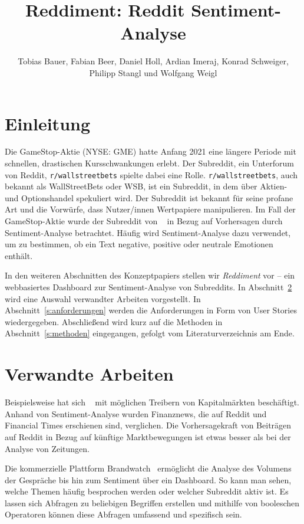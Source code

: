 \documentclass[a4paper, 10pt, conference]{ieeeconf}
\title{\LARGE \bf
Reddiment: Reddit Sentiment-Analyse
}
\author{Tobias Bauer, Fabian Beer,  Daniel Holl,  Ardian Imeraj,  Konrad Schweiger,  Philipp Stangl und Wolfgang Weigl
}
\begin{document}
\maketitle
\thispagestyle{empty}
\pagestyle{empty}

\section{Einleitung}

Die GameStop-Aktie (NYSE: GME) hatte Anfang 2021 eine längere Periode mit schnellen, drastischen Kursschwankungen erlebt. Der Subreddit,  ein Unterforum von Reddit,  \texttt{r/wallstreetbets} spielte dabei eine Rolle. \texttt{r/wallstreetbets}, auch bekannt als WallStreetBets oder WSB, ist ein Subreddit, in dem über Aktien- und Optionshandel spekuliert wird.  Der Subreddit ist bekannt für seine profane Art und die Vorwürfe, dass Nutzer/innen Wertpapiere manipulieren. Im Fall der GameStop-Aktie wurde der Subreddit von \citeauthor{wang2021}~\cite{wang2021} in Bezug auf Vorhersagen durch Sentiment-Analyse betrachtet. Häufig wird Sentiment-Analyse dazu verwendet, um zu bestimmen, ob ein Text negative, positive oder neutrale Emotionen enthält.

In den weiteren Abschnitten des Konzeptpapiers stellen wir \textit{Reddiment} vor -- ein webbasiertes Dashboard zur Sentiment-Analyse von Subreddits. In Abschnitt~\ref{s:verwandte_arbeiten} wird eine Auswahl verwandter Arbeiten vorgestellt.  In Abschnitt~\ref{s:anforderungen} werden die Anforderungen in Form von User Stories wiedergegeben.  Abschließend wird kurz auf die Methoden in Abschnitt~\ref{s:methoden} eingegangen, gefolgt vom Literaturverzeichnis am Ende.


\section{Verwandte Arbeiten} \label{s:verwandte_arbeiten}

Beispielsweise hat sich \citeauthor{lubitz2017}~\cite{lubitz2017} mit möglichen Treibern von Kapitalmärkten beschäftigt. Anhand von Sentiment-Analyse wurden Finanznews, die auf Reddit und Financial Times erschienen sind, verglichen. Die Vorhersagekraft von Beiträgen auf Reddit in Bezug auf künftige Marktbewegungen ist etwas besser als bei der Analyse von Zeitungen.

Die kommerzielle Plattform Brandwatch~\cite{brandwatch} ermöglicht die Analyse des Volumens der Gespräche bis hin zum Sentiment über ein Dashboard. So kann man sehen, welche Themen häufig besprochen werden oder welcher Subreddit aktiv ist. Es lassen sich Abfragen zu beliebigen Begriffen erstellen und mithilfe von booleschen Operatoren können diese Abfragen umfassend und spezifisch sein.
\end{document}
